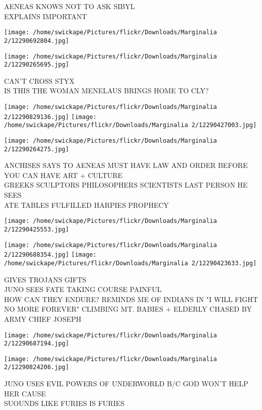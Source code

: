 \documentclass[10pt,letterpaper]{article}
\begin{document}
AENEAS KNOWS NOT TO ASK SIBYL\\
EXPLAINS IMPORTANT
\pagebreak

\texttt{[image: /home/swickape/Pictures/flickr/Downloads/Marginalia 2/12290692804.jpg]}

\vspace{0.25in}
\texttt{[image: /home/swickape/Pictures/flickr/Downloads/Marginalia 2/12290265695.jpg]}

CAN'T CROSS STYX\\
IS THIS THE WOMAN MENELAUS BRINGS HOME TO CLY?
\pagebreak

\texttt{[image: /home/swickape/Pictures/flickr/Downloads/Marginalia 2/12290829136.jpg]}
\texttt{[image: /home/swickape/Pictures/flickr/Downloads/Marginalia 2/12290427003.jpg]}

\vspace{0.25in}
\texttt{[image: /home/swickape/Pictures/flickr/Downloads/Marginalia 2/12290264275.jpg]}

ANCHISES SAYS TO AENEAS MUST HAVE LAW AND ORDER BEFORE YOU CAN HAVE ART + CULTURE\\
GREEKS SCULPTORS PHILOSOPHERS SCIENTISTS LAST PERSON HE SEES\\
ATE TABLES FULFILLED HARPIES PROPHECY
\pagebreak

\texttt{[image: /home/swickape/Pictures/flickr/Downloads/Marginalia 2/12290425553.jpg]}

\vspace{0.25in}
\texttt{[image: /home/swickape/Pictures/flickr/Downloads/Marginalia 2/12290688354.jpg]}
\texttt{[image: /home/swickape/Pictures/flickr/Downloads/Marginalia 2/12290423633.jpg]}

GIVES TROJANS GIFTS\\
JUNO SEES FATE TAKING COURSE PAINFUL\\
HOW CAN THEY ENDURE?  REMINDS ME OF INDIANS IN "I WILL FIGHT NO MORE FOREVER" CLIMBING MT. BABIES + ELDERLY CHASED BY ARMY CHIEF JOSEPH
\pagebreak

\texttt{[image: /home/swickape/Pictures/flickr/Downloads/Marginalia 2/12290687194.jpg]}

\vspace{0.25in}
\texttt{[image: /home/swickape/Pictures/flickr/Downloads/Marginalia 2/12290824206.jpg]}

JUNO USES EVIL POWERS OF UNDERWORLD B/C GOD WON'T HELP HER CAUSE\\
SUOUNDS LIKE FURIES IS FURIES
\pagebreak
\end{document}
